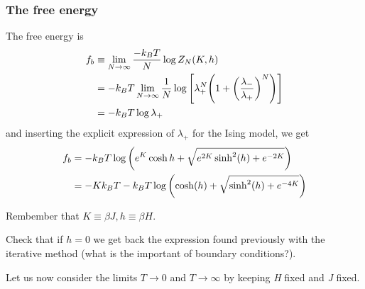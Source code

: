 \documentclass[../main/main.tex]{subfiles}
\begin{document}
\subsubsection{The free energy}
The free energy is
\begin{equation}
\begin{split}
    f_b & \equiv \lim_{N \rightarrow \infty } \frac{-k_B T}{N} \log{Z_N (K,h)}   \\
    & = -k_B T \lim_{N \rightarrow \infty } \frac{1}{N}  \log{\qty[\lambda _+^N \qty(1+\qty(\frac{\lambda _-}{\lambda _+})^N ) ] } \\
    & = -k_B T \log{\lambda _+}
\end{split}
\end{equation}
and inserting the explicit expression of \( \lambda _+ \) for the Ising model, we get
\begin{equation}
\begin{split}
f_b  &=  -k_B T \log{ \qty( e^{K} \cosh h + \sqrt{e^{2K} \sinh^2 (h) + e^{-2K}  } ) } \\
& = -K k_B T - k_B T \log{\qty( \cosh(h)+\sqrt{\sinh^2(h)+e^{-4K}  } )}
\end{split}
\end{equation}
\begin{remark}
Rembember that \( K \equiv \beta J, h \equiv \beta H\).
\end{remark}
\begin{exercise}
Check that if \( h=0 \) we get back the expression found previously with the iterative method (what is the important of boundary conditions?).
\end{exercise}
Let us now consider the limits \( T \rightarrow 0 \) and \( T \rightarrow \infty  \) by keeping \emph{H} fixed and \emph{J} fixed.
\end{document}
